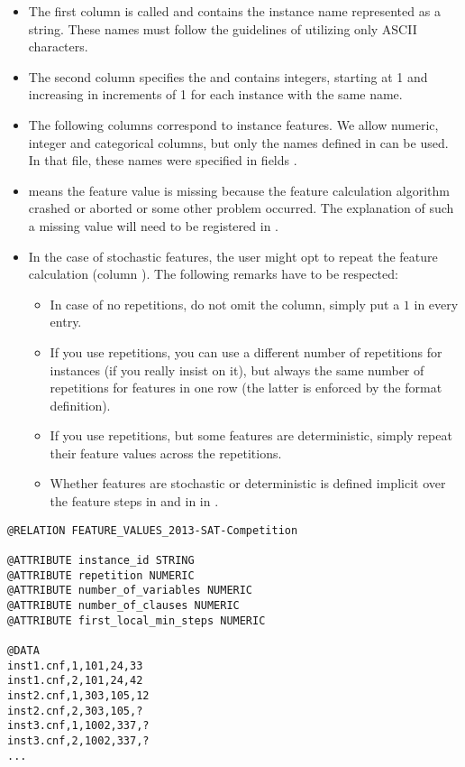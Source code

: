 \begin{itemize}
  	\item The first column is called  and contains the instance name represented as a string. 
		These names must follow the guidelines of utilizing only ASCII characters.
  	\item The second column specifies the  and contains integers, starting at 1 and increasing in 
  		increments of 1 for each instance with the same name.  
  	\item The following columns correspond to instance features. We allow numeric, integer and categorical columns,
		but only the names defined in  can be used. In that file, these names were specified 
		in fields .
 	 \item \qm means the feature value is missing because the feature calculation algorithm crashed or aborted or
    		some other problem occurred. The explanation of such a missing value will need to be registered in 
		.
  	\item In the case of stochastic features, the user might opt to repeat the feature calculation (column
		). The following remarks have to be respected: 
        		\begin{itemize}
          		\item In case of no repetitions, do not omit the column, simply put a $1$ in every 
                          entry. 
          		\item If you use repetitions, you can use a different number of repetitions for instances (if you 
				really insist on it), but always the same number of repetitions for features in one row
                			(the latter is enforced by the format definition). 
          		\item If you use repetitions, but some features are deterministic, simply repeat their feature values 
				across the repetitions.
          		\item Whether features are stochastic or deterministic is defined implicit over the feature steps 
          		in  and  in in .
        		\end{itemize} 
\end{itemize} 

\begin{lstlisting}[caption=Example feature\_values.arff with three features]
@RELATION FEATURE_VALUES_2013-SAT-Competition

@ATTRIBUTE instance_id STRING
@ATTRIBUTE repetition NUMERIC
@ATTRIBUTE number_of_variables NUMERIC
@ATTRIBUTE number_of_clauses NUMERIC
@ATTRIBUTE first_local_min_steps NUMERIC

@DATA
inst1.cnf,1,101,24,33
inst1.cnf,2,101,24,42
inst2.cnf,1,303,105,12
inst2.cnf,2,303,105,?
inst3.cnf,1,1002,337,?
inst3.cnf,2,1002,337,?
...
\end{lstlisting}


